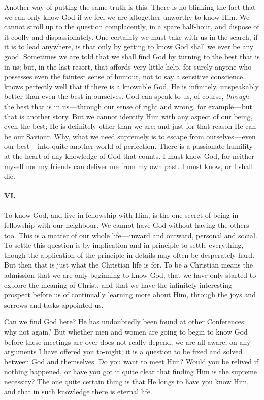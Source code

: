 \documentclass[12pt]{article}
\begin{document}
Another way of putting the same truth is this. There is no blinking the
fact that we can only know God if we feel we are altogether unworthy to
know Him. We cannot stroll up to the question complacently, in a spare
half-hour, and dispose of it coolly and dispassionately. One certainty
we must take with us in the search, if it is to lead anywhere, is that
only by getting to know God shall we ever be any good. Sometimes we are
told that we shall find God by turning to the best that is in us; but,
in the last resort, that affords very little help, for surely anyone who
possesses even the faintest sense of humour, not to say a sensitive
conscience, knows perfectly well that if there is a knowable God, He is
infinitely, unspeakably better than even the best in ourselves. God can
speak to us, of course, \emph{through} the best that is in
us --- through our sense of right and wrong, for example --- but that is
another story. But we cannot identify Him with any aspect of our being,
even the best; He is definitely other than we are; and just for that
reason He can be our Saviour. Why, what we need supremely is to escape
from ourselves --- even our best --- into quite another world of
perfection. There is a passionate humility at the heart of any knowledge
of God that counts. I must know God, for neither myself nor my friends
can deliver me from my own past. I must know, or I shall die.

\paragraph{VI.}\label{21c4}

To know God, and live in fellowship with Him, is the one secret of being
in fellowship with our neighbour. We cannot have God without having the
others too. This is a matter of our whole life --- inward and outward,
personal and social. To settle this question is by implication and in
principle to settle everything, though the application of the principle
in details may often be desperately hard. But then that is just what the
Christian life is for. To be a Christian means the admission that we are
only beginning to know God, that we have only started to explore the
meaning of Christ, and that we have the infinitely interesting prospect
before us of continually learning more about Him, through the joys and
sorrows and tasks appointed us.

Can we find God here? He has undoubtedly been found at other
Conferences; why not again? But whether men and women are going to begin
to know God before these meetings are over does not really depend, we
are all aware, on any arguments I have offered you to-night; it is a
question to be fixed and solved between God and themselves. Do you want
to meet Him? Would you be relived if nothing happened, or have you got
it quite clear that finding Him is the supreme necessity? The one quite
certain thing is that He longs to have you know Him, and that in such
knowledge there is eternal life.
\end{document}
